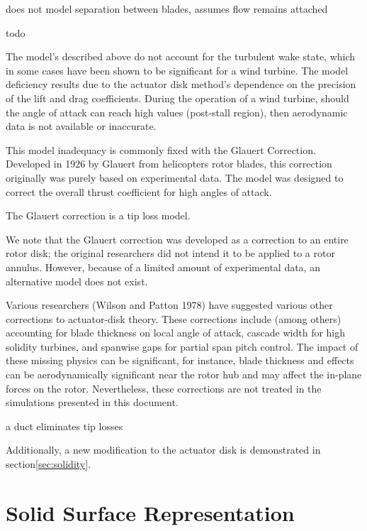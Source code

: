 does not model separation between blades, assumes flow remains attached

todo

The model's described above do not account for the turbulent wake state,
which in some cases have been shown to be significant for a wind
turbine. The model deficiency results due to the actuator disk
method's dependence on the precision of the lift and drag
coefficients. During the operation of a wind turbine, should the angle
of attack can reach high values (post-stall region), then aerodynamic 
data is not available or inaccurate. 
   
This model inadequacy is commonly fixed with the Glauert Correction. 
Developed in 1926 by Glauert from helicopters rotor blades, this
correction originally was purely based on experimental data. The model
was designed to correct the overall thrust coefficient for high angles
of attack. 

The Glauert correction is a tip loss model.

We note that the Glauert correction was developed as a correction to an
entire rotor disk; the original researchers did not intend it to be
applied to a rotor annulus. However, because of a limited amount  of
experimental data, an alternative model does not exist.  

Various researchers\cite{?} (Wilson and Patton  1978) have suggested
various other corrections to actuator-disk theory. These corrections
include (among others) accounting for blade thickness on local angle of
attack, cascade width for high solidity turbines, and spanwise gaps for
partial span pitch control. The impact of these missing physics can be
significant, for instance, blade thickness and effects can be  
aerodynamically significant near the rotor hub and may affect the
in-plane forces on the rotor\cite{Moriarty_aerodyntheory}. Nevertheless,
these corrections are not treated in the simulations presented in this
document.  


a duct eliminates tip losses

Additionally, a new modification to the actuator disk is demonstrated in 
section\ref{sec:solidity}. 

\section{Solid Surface Representation}
\label{subsec:solid_surface}

